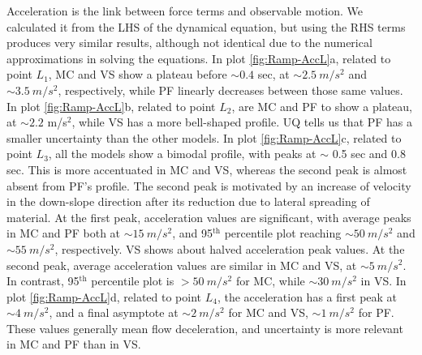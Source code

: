 \documentclass{article}
\begin{document}
Acceleration is the link between force terms and observable motion. We calculated it from the LHS of the dynamical equation, but using the RHS terms produces very similar results, although not identical due to the numerical approximations in solving the equations. In plot \ref{fig:Ramp-AccL}a, related to point $L_1$, MC and VS show a plateau before $\sim 0.4$ sec, at $\sim 2.5 \ m/s^2$ and $\sim 3.5 \ m/s^2$, respectively, while PF linearly decreases between those same values. In plot \ref{fig:Ramp-AccL}b, related to point $L_2$, are MC and PF to show a plateau, at $\sim 2.2$ m/s$^2$, while VS has a more bell-shaped profile. UQ tells us that PF has a smaller uncertainty than the other models. In plot \ref{fig:Ramp-AccL}c, related to point $L_3$, all the models show a bimodal profile, with peaks at $\sim$ 0.5 sec and 0.8 sec. This is more accentuated in MC and VS, whereas the second peak is almost absent from PF's profile. The second peak is motivated by an increase of velocity in the down-slope direction after its reduction due to lateral spreading of material. At the first peak, acceleration values are significant, with average peaks in MC and PF both at $\sim 15 \ m/s^2$, and 95$^{\mathrm{th}}$ percentile plot reaching $\sim 50 \ m/s^2$ and $\sim 55 \ m/s^2$, respectively. VS shows about halved acceleration peak values. At the second peak, average acceleration values are similar in MC and VS, at $\sim 5 \ m/s^2$. In contrast, 95$^{\mathrm{th}}$ percentile plot is $> 50 \ m/s^2$ for MC, while $\sim 30 \ m/s^2$ in VS. In plot \ref{fig:Ramp-AccL}d, related to point $L_4$, the acceleration has a first peak at $\sim 4 \ m/s^2$, and a final asymptote at $\sim 2 \ m/s^2$ for MC and VS, $\sim 1 \ m/s^2$ for PF. These values generally mean flow deceleration, and uncertainty is more relevant in MC and PF than in VS.
\end{document}
